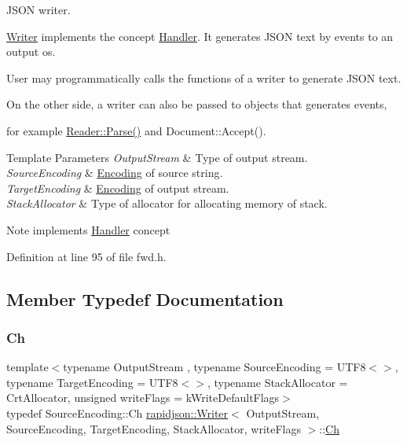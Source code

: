 J\+S\+ON writer. 

\mbox{\hyperlink{classrapidjson_1_1_writer}{Writer}} implements the concept \mbox{\hyperlink{classrapidjson_1_1_handler}{Handler}}. It generates J\+S\+ON text by events to an output os.

User may programmatically calls the functions of a writer to generate J\+S\+ON text.

On the other side, a writer can also be passed to objects that generates events,

for example \mbox{\hyperlink{classrapidjson_1_1_generic_reader_ac9c540b77de19661f6f45e04b9b0937b}{Reader\+::\+Parse()}} and Document\+::\+Accept().


\begin{DoxyTemplParams}{Template Parameters}
{\em Output\+Stream} & Type of output stream. \\
\hline
{\em Source\+Encoding} & \mbox{\hyperlink{classrapidjson_1_1_encoding}{Encoding}} of source string. \\
\hline
{\em Target\+Encoding} & \mbox{\hyperlink{classrapidjson_1_1_encoding}{Encoding}} of output stream. \\
\hline
{\em Stack\+Allocator} & Type of allocator for allocating memory of stack. \\
\hline
\end{DoxyTemplParams}
\begin{DoxyNote}{Note}
implements \mbox{\hyperlink{classrapidjson_1_1_handler}{Handler}} concept 
\end{DoxyNote}


Definition at line 95 of file fwd.\+h.



\subsection{Member Typedef Documentation}
\mbox{\label{classrapidjson_1_1_writer_a2cf973937ca1110293bf1350fac2a6d6}} 
\subsubsection{\texorpdfstring{Ch}{Ch}}
{\footnotesize\ttfamily template$<$typename Output\+Stream , typename Source\+Encoding  = U\+T\+F8$<$$>$, typename Target\+Encoding  = U\+T\+F8$<$$>$, typename Stack\+Allocator  = Crt\+Allocator, unsigned write\+Flags = k\+Write\+Default\+Flags$>$ \\
typedef Source\+Encoding\+::\+Ch \mbox{\hyperlink{classrapidjson_1_1_writer}{rapidjson\+::\+Writer}}$<$ Output\+Stream, Source\+Encoding, Target\+Encoding, Stack\+Allocator, write\+Flags $>$\+::\mbox{\hyperlink{classrapidjson_1_1_writer_a2cf973937ca1110293bf1350fac2a6d6}{Ch}}}



